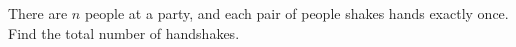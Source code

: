 There are $n$ people at a party, and each pair of people shakes hands exactly once. Find the total number of handshakes.
